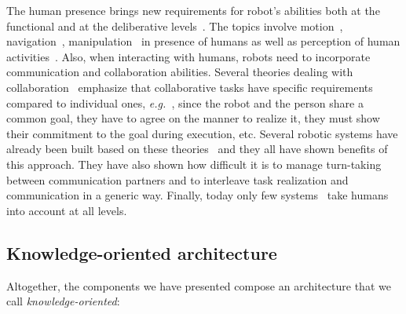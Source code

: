 \documentclass[preprint,5p]{elsarticle}
\newcommand{\eg}{{\textit{e.g.\ }}}
\begin{document}
The human presence brings new requirements for robot's abilities both
at the functional and at the deliberative levels~\cite{Klein2004}. The
topics involve motion~\cite{Kulic2007,Berg2004,Madhava2006},
navigation~\cite{Althaus2004,Sisbot2007}, manipulation~\cite{Kemp2007}
in presence of humans as well as perception of human
activities~\cite{Breazeal2001,Burger2008}. Also, when
interacting with humans, robots need to incorporate communication and
collaboration abilities. Several theories dealing with
collaboration~\cite{Cohen1991,Grosz1996,Clark1996} emphasize that
collaborative tasks have specific requirements compared to individual
ones, \eg, since the robot and the person share a common goal, they
have to agree on the manner to realize it, they must show their
commitment to the goal during execution, etc. Several robotic systems
have already been built based on these
theories~\cite{Rich1997,Sidner2005,Tambe2005a,Breazeal2003} and they
all have shown benefits of this approach. They have also shown how
difficult it is to manage turn-taking between communication partners
and to interleave task realization and communication in a generic
way. Finally, today only few
systems~\cite{Fong2006,Breazeal2003,Sisbot2008} take humans into
account at all levels.


\subsection{Knowledge-oriented architecture}

Altogether, the components we have presented compose an architecture that we
call \emph{knowledge-oriented}:
\end{document}

